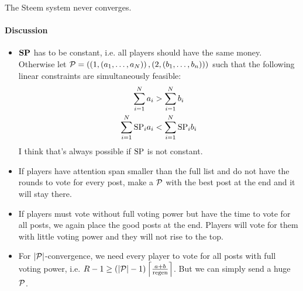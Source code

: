 \begin{theorem}
  The Steem system never converges.
\end{theorem}

  \paragraph{Discussion}
    \begin{itemize}
      \item $\stpowvec$ has to be constant, i.e. all players should have the
      same money. Otherwise let $\postlist = \left(\left(1, \left(a_1, \dots,
      a_\playerlen\right)\right), \left(2, \left(b_1, \dots,
      b_n\right)\right)\right)$ such that the following linear constraints are
      simultaneously feasible:
      \begin{gather*}
        \sum\limits_{i=1}^\playerlen a_i > \sum\limits_{i=1}^\playerlen b_i \\
        \sum\limits_{i=1}^\playerlen \stpow_i a_i < \sum\limits_{i=1}^\playerlen
        \stpow_i  b_i \\
      \end{gather*}
      I think that's always possible if $\stpow$ is not constant.
      \item If players have attention span smaller than the full list and do not
      have the rounds to vote for every post, make a $\postlist$ with the best
      post at the end and it will stay there.
      \item If players must vote without full voting power but have the time to
      vote for all posts, we again place the good posts at the end. Players will
      vote for them with little voting power and they will not rise to the top.
      \item For $|\postlist|$-convergence, we need every player to vote for all
      posts with full voting power, i.e. $R - 1 \geq \left(|\postlist| -
      1\right) \ceil*{\frac{a + b}{\regen}}$. But we can simply send a huge
      $\postlist$.
    \end{itemize}

